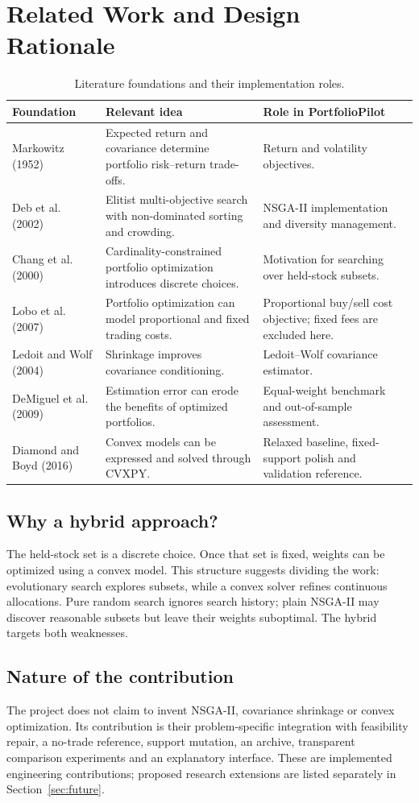 \documentclass[12pt,a4paper]{article}
\newcommand{\newsec}[1]{\section{#1}}
\begin{document}
\newsec{Related Work and Design Rationale}
\begin{table}[H]\centering\small
\begin{tabularx}{\linewidth}{@{}p{32mm}YY@{}}\toprule
Foundation & Relevant idea & Role in PortfolioPilot\\\midrule
Markowitz (1952) \cite{markowitz} & Expected return and covariance determine portfolio risk--return trade-offs. & Return and volatility objectives.\\
Deb et al. (2002) \cite{deb} & Elitist multi-objective search with non-dominated sorting and crowding. & NSGA-II implementation and diversity management.\\
Chang et al. (2000) \cite{chang} & Cardinality-constrained portfolio optimization introduces discrete choices. & Motivation for searching over held-stock subsets.\\
Lobo et al. (2007) \cite{lobo} & Portfolio optimization can model proportional and fixed trading costs. & Proportional buy/sell cost objective; fixed fees are excluded here.\\
Ledoit and Wolf (2004) \cite{ledoit} & Shrinkage improves covariance conditioning. & Ledoit--Wolf covariance estimator.\\
DeMiguel et al. (2009) \cite{demiguel} & Estimation error can erode the benefits of optimized portfolios. & Equal-weight benchmark and out-of-sample assessment.\\
Diamond and Boyd (2016) \cite{cvxpy} & Convex models can be expressed and solved through CVXPY. & Relaxed baseline, fixed-support polish and validation reference.\\\bottomrule
\end{tabularx}
\caption{Literature foundations and their implementation roles.}
\end{table}
\subsection{Why a hybrid approach?}
The held-stock set is a discrete choice. Once that set is fixed, weights can be optimized using a convex model. This structure suggests dividing the work: evolutionary search explores subsets, while a convex solver refines continuous allocations. Pure random search ignores search history; plain NSGA-II may discover reasonable subsets but leave their weights suboptimal. The hybrid targets both weaknesses.
\subsection{Nature of the contribution}
The project does not claim to invent NSGA-II, covariance shrinkage or convex optimization. Its contribution is their problem-specific integration with feasibility repair, a no-trade reference, support mutation, an archive, transparent comparison experiments and an explanatory interface. These are implemented engineering contributions; proposed research extensions are listed separately in Section~\ref{sec:future}.
\end{document}
